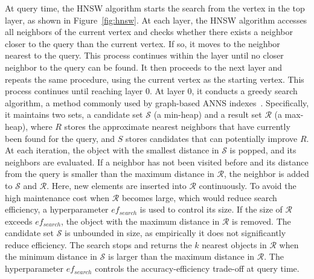 At %
query time, the HNSW algorithm starts the search from the vertex in the top layer, as shown in Figure~\ref{fig:hnsw}. %
{At each layer, the HNSW algorithm accesses all neighbors of the current vertex and checks whether there exists a neighbor closer to the query than the current vertex. If so, it moves to the neighbor nearest to the query. This process continues within the layer until no closer neighbor to the query can be found.
It then proceeds to the next layer and repeats the same procedure, using the current vertex as the starting vertex. This process continues until reaching layer 0.} 
At layer 0, it conducts a greedy search algorithm, a method commonly used by %
graph-based ANNS indexes~\cite{wang2021comprehensive,fu2019fast,liApproximateNearestNeighbor2020,DBLP:journals/pami/FuWC22,DBLP:journals/is/MalkovPLK14,DBLP:conf/cvpr/HarwoodD16}. Specifically, it maintains two sets, a candidate set $\mathcal{S}$ (a min-heap) and a result set $\mathcal{R}$ (a max-heap), where $R$ stores the approximate nearest neighbors that have currently been found for the query, and $S$ stores candidates that can potentially improve $R$. At each iteration, the object with the smallest distance in $\mathcal{S}$ is popped, and its neighbors are evaluated. If a neighbor has not been visited before and its distance from the query is smaller than the maximum distance in $\mathcal{R}$, the neighbor is added to $\mathcal{S}$ and $\mathcal{R}$. Here, new elements are inserted into $\mathcal{R}$ continuously.
To avoid the high maintenance cost when $\mathcal{R}$ becomes large, which would reduce search efficiency, a hyperparameter $ef_{search}$ is used to control its size. If the size of $\mathcal{R}$ exceeds $ef_{search}$, the object with the maximum distance in $\mathcal{R}$ is removed. The candidate set $\mathcal{S}$ is unbounded in size, as empirically it does not significantly reduce efficiency. The search stops and returns the $k$ nearest objects in $\mathcal{R}$ when the minimum distance in $\mathcal{S}$ is larger than the maximum distance in $\mathcal{R}$. The hyperparameter $ef_{search}$ controls the accuracy-efficiency trade-off at query time.




